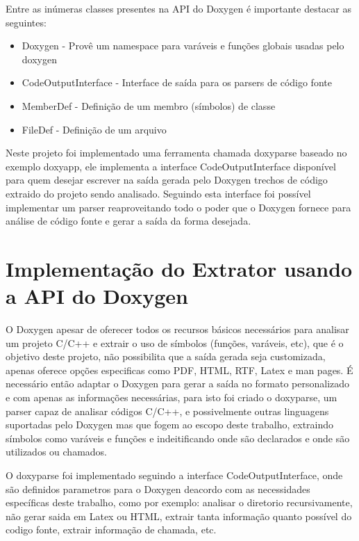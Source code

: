 Entre as inúmeras classes presentes na API do Doxygen é importante destacar as
seguintes:

\begin{itemize}
\item Doxygen - Provê um namespace para varáveis e funções globais usadas pelo
doxygen
\item CodeOutputInterface - Interface de saída para os parsers de código fonte
\item MemberDef - Definição de um membro (símbolos) de classe
\item FileDef - Definição de um arquivo
\end{itemize}

Neste projeto foi implementado uma ferramenta chamada doxyparse baseado no
exemplo doxyapp, ele implementa a interface CodeOutputInterface disponível para
quem desejar escrever na saída gerada pelo Doxygen trechos de código extraido
do projeto sendo analisado. Seguindo esta interface foi possível implementar um
parser reaproveitando todo o poder que o Doxygen fornece para análise de código
fonte e gerar a saída da forma desejada.

\section{Implementação do Extrator usando a API do Doxygen}

O Doxygen apesar de oferecer todos os recursos básicos necessários para
analisar um projeto C/C++ e extrair o uso de símbolos (funções, varáveis, etc),
que é o objetivo deste projeto, não possibilita que a saída gerada seja
customizada, apenas oferece opções especificas como PDF, HTML, RTF, Latex e man
pages. É necessário então adaptar o Doxygen para gerar a saída no formato
personalizado e com apenas as informações necessárias, para isto foi criado o
doxyparse, um parser capaz de analisar códigos C/C++, e possivelmente outras
linguagens suportadas pelo Doxygen mas que fogem ao escopo deste trabalho,
extraindo símbolos como varáveis e funções e indeitificando onde são declarados
e onde são utilizados ou chamados.

O doxyparse foi implementado seguindo a interface CodeOutputInterface, onde
são definidos parametros para o Doxygen deacordo com as necessidades específicas
deste trabalho, como por exemplo: analisar o diretorio recursivamente, não gerar
saida em Latex ou HTML, extrair tanta informação quanto possível do codigo
fonte, extrair informação de chamada, etc.

